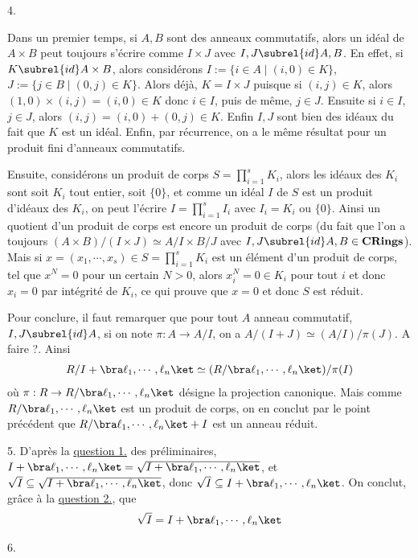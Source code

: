 \documentclass[11pt]{article}
\newcommand{\cor}[1]{{\color{red} #1}}
\begin{document}
    \begin{question}{4.}
        \item Dans un premier temps, si $A,B$ sont des anneaux commutatifs, alors un idéal de $A \times B$ peut toujours s'écrire comme $I \times J$ avec $I,J \subrel{id} A,B$. En effet, si $K \subrel{id} A \times B$, alors considérons $I := \{i \in A \mid (i,0) \in K\}$, $J := \{j \in B \mid (0,j) \in  K\}$. Alors déjà, $K = I \times J$ puisque si $(i,j) \in K$, alors $(1,0) \times (i,j) = (i,0) \in K$ donc $i \in I$, puis de même, $j \in J$. Ensuite si $i \in I$, $j \in J$, alors $(i,j) = (i,0) + (0,j) \in K$. Enfin $I,J$ sont bien des idéaux du fait que $K$ est un idéal. Enfin, par récurrence, on a le même résultat pour un produit fini d'anneaux commutatifs.
        \item Ensuite, considérons un produit de corps $S = \prod_{i = 1}^s K_i$, alors les idéaux des $K_i$ sont soit $K_i$ tout entier, soit $\{0\}$, et comme un idéal $I$ de $S$ est un produit d'idéaux des $K_i$, on peut l'écrire $I = \prod_{i = 1}^s I_i$ avec $I_i = K_i$ ou $\{0\}$. Ainsi un quotient d'un produit de corps est encore un produit de corps (du fait que l'on a toujours $(A \times B)/(I \times J) \simeq A/I \times B/J$ avec $I,J \subrel{id} A,B \in \mathbf{CRings}$). Mais si $x = (x_1, \cdots, x_s) \in S = \prod_{i = 1}^s K_i$ est un élément d'un produit de corps, tel que $x^N = 0$ pour un certain $N > 0$, alors $x_i^N = 0 \in K_i$ pour tout $i$ et donc $x_i = 0$ par intégrité de $K_i$, ce qui prouve que $x = 0$ et donc $S$ est réduit. 
        \item Pour conclure, il faut remarquer que pour tout $A$ anneau commutatif, $I,J \subrel{id} A$, si on note $\pi : A \to A/I$, on a $A/(I + J) \simeq (A/I)/\pi(J)$. \cor{A faire ?}. Ainsi 
        \begin{align*}
            R/I + \bra \ell_1, \cdots, \ell_n \ket \simeq (R/\bra \ell_1, \cdots, \ell_n \ket)/\pi(I)
        \end{align*}
        où $\pi : R \to R/\bra \ell_1, \cdots, \ell_n \ket$ désigne la projection canonique. Mais comme $R/\bra \ell_1, \cdots, \ell_n \ket$ est un produit de corps, on en conclut par le point précédent que $R/\bra \ell_1, \cdots, \ell_n \ket + I$ est un anneau réduit.
    \end{question}
    \begin{question}{5.}
        D'après la \hyperref[q11]{question 1.} des préliminaires, $I + \bra \ell_1, \cdots, \ell_n \ket = \sqrt{I + \bra \ell_1, \cdots, \ell_n \ket}$, et $\sqrt{I} \subseteq \sqrt{I + \bra \ell_1, \cdots, \ell_n \ket}$, donc $\sqrt{I} \subseteq I + \bra \ell_1, \cdots, \ell_n \ket$. On conclut, grâce à la \hyperref[q22]{question 2.}, que
        \begin{align*}
            \sqrt{I} = I + \bra \ell_1, \cdots, \ell_n \ket
        \end{align*}
    \end{question}
    \begin{question}{6.}

    \end{question}
    
\end{document}
